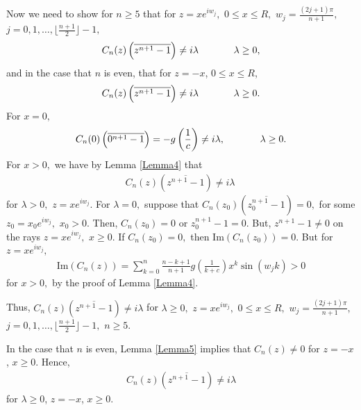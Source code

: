 \documentclass[final]{siamltex}
\begin{document}
Now we need to show for  $n \geq 5$ that for $z = xe^{iw_{j}},$ $0 \leq x \leq R,$ $w_{j} = \frac{ (2j+1) \pi} {n+1},$ $j = 0, 1, \ldots, \lfloor \frac{n+1}{2} \rfloor -1,$
 \begin{eqnarray*} C_{n}(z) \left( \overline{z^{n+1}-1} \right) \neq i \lambda \hspace{.5in} \lambda \geq 0,
 \end{eqnarray*}
and in the case that $n$ is even, that for $z = -x$, $0 \leq x \leq R$, 
 \begin{eqnarray*} C_{n}(z) \left( \overline{z^{n+1}-1} \right) \neq i \lambda \hspace{.5in} \lambda \geq 0.
 \end{eqnarray*} 
  For $x=0,$ 
 \begin{eqnarray*}  C_{n}(0) \left( \overline{0^{n+1}-1} \right)  =  -g \left( \frac{1}{c} \right) \neq i \lambda, \hspace{.5in} \lambda \geq 0.
 \end{eqnarray*}
 For $x > 0,$ we have by Lemma \ref{Lemma4} that
 \begin{eqnarray*} C_{n}(z) \left( \overline{z^{n+1}-1} \right) \neq i \lambda \
  \end{eqnarray*} 
 for $\lambda > 0,$ $z = xe^{iw_{j}}.$ 
  For $\lambda = 0,$ suppose that $C_{n}(z_{0}) \left( \overline{z_{0}^{n+1}-1} \right) = 0,$ for some $z_{0} = x_{0}e^{iw_{j}},$ $x_{0} > 0.$ 
  Then, $C_{n}(z_{0}) = 0$ or $z_{0}^{n+1} -1 = 0.$ 
  But, $z^{n+1}-1 \neq 0$ on the rays $z = xe^{iw_{j}},$ $x \geq 0.$ 
  If $C_{n}(z_{0}) = 0,$ then $\mbox{Im} \left( C_{n}(z_{0} ) \right) = 0.$ 
 But for $z = xe^{iw_{j}},$ 
  \begin{eqnarray*} \mbox{Im} \left( C_{n}(z) \right)  = \sum_{k=0}^{n} \frac{n-k+1}{n+1} g \left( \frac{1}{k+c} \right) x^{k} \sin(w_{j}k) > 0 
 \end{eqnarray*} 
  for $x > 0,$ by the proof of Lemma \ref{Lemma4}. 
  
 Thus,  $C_{n}(z) \left( \overline{z^{n+1}-1} \right) \neq i \lambda$ for $\lambda \geq 0,$ $z = xe^{iw_{j}},$ $0 \leq x \leq R,$ $w_{j} = \frac{ (2j+1) \pi}{n+1},$ $ j = 0, 1, \ldots, \lfloor \frac{n+1}{2} \rfloor -1,$ $n \geq 5.$ 

In the case that $n$ is even, Lemma \ref{Lemma5} implies that $C_{n}(z) \neq 0$ for $z = -x$,  $x \geq 0$.  Hence,  
 \begin{eqnarray*} C_{n}(z) \left( \overline{z^{n+1}-1} \right) \neq i \lambda 
 \end{eqnarray*} 
for $\lambda \geq 0$, $z = -x$, $x \geq 0.$ 
\end{document}
